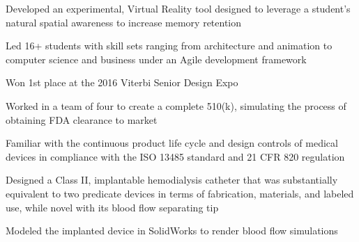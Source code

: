 \documentclass[letterpaper]{deedy-resume} %
\begin{document}
\begin{minipage}[t]{0.66\textwidth}
\sectionspace %




\vspace{\topsep} %

\begin{tightitemize}
\item Developed an experimental, Virtual Reality tool designed to leverage a student’s natural spatial awareness to increase memory retention
\item Led 16+ students with skill sets ranging from architecture and animation to computer science and business under an Agile development framework
\item Won 1st place at the 2016 Viterbi Senior Design Expo 
\end{tightitemize}

\sectionspace



\vspace{\topsep} %

\begin{tightitemize}
\item Worked in a team of four to create a complete 510(k), simulating the process of obtaining FDA clearance to market
\item Familiar with the continuous product life cycle and design controls of medical devices in compliance with the ISO 13485 standard and 21 CFR 820 regulation  
\item Designed a Class II, implantable hemodialysis catheter that was substantially equivalent to two predicate devices in terms of fabrication, materials, and labeled use, while novel with its blood flow separating tip 
\item Modeled the implanted device in SolidWorks to render blood flow simulations 
\end{tightitemize}

\sectionspace 


\vspace{\topsep} %


\end{minipage}
\end{document}
